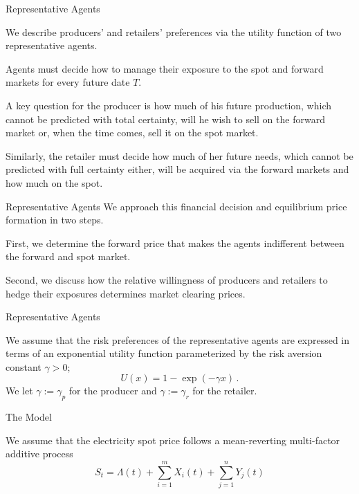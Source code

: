 {Representative Agents}







	We describe producers' and retailers'
preferences via the utility function of two representative agents.


	Agents
must decide how to manage their exposure to the spot and forward
markets for every future date $T$.


	
A key question for the producer
is how much of his future production, which cannot be predicted with
total certainty, will he wish to sell on the forward market or, when
the time comes, sell it on the spot market.


	Similarly, the retailer
must decide how much of her future needs, which cannot be predicted
with full certainty either, will be acquired via the forward markets
and how much on the spot.





{Representative Agents}
We approach this financial decision and
equilibrium price formation in two steps.







	First, we determine the
forward price that makes the agents indifferent between the forward
and spot market.


	Second, we discuss how the relative willingness
of producers and retailers to hedge their exposures determines
market clearing prices.





{Representative Agents}

We assume that the risk preferences of the representative agents are
expressed in terms of an exponential utility function parameterized
by the risk aversion constant $\gamma>0$;
$$
U(x)=1-\exp(-\gamma x)\,.
$$
We let $\gamma:=\gamma_p$ for the producer and $\gamma:=\gamma_r$
for the retailer.

{The Model}






	
We assume that the electricity spot price follows a
mean-reverting multi-factor additive process
\begin{equation}\label{equation for additive stock price}
S_t=\Lambda(t)+\sum_{i=1}^mX_i(t)+\sum_{j=1}^nY_j(t)
\end{equation}



